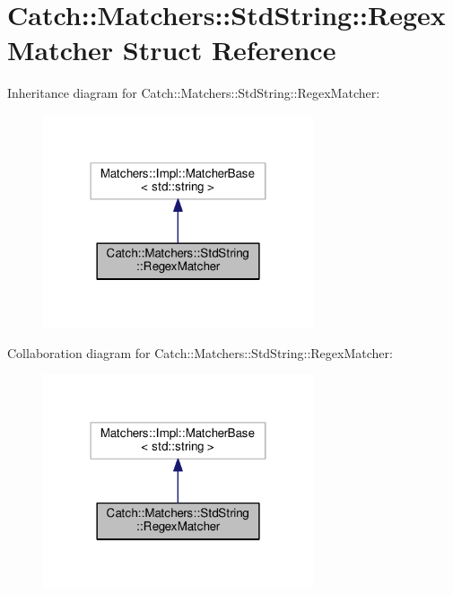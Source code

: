 \hypertarget{structCatch_1_1Matchers_1_1StdString_1_1RegexMatcher}{}\section{Catch\+:\+:Matchers\+:\+:Std\+String\+:\+:Regex\+Matcher Struct Reference}
\label{structCatch_1_1Matchers_1_1StdString_1_1RegexMatcher}


Inheritance diagram for Catch\+:\+:Matchers\+:\+:Std\+String\+:\+:Regex\+Matcher\+:
\nopagebreak
\begin{figure}[H]
\begin{center}
\leavevmode
\includegraphics[width=226pt]{structCatch_1_1Matchers_1_1StdString_1_1RegexMatcher__inherit__graph}
\end{center}
\end{figure}


Collaboration diagram for Catch\+:\+:Matchers\+:\+:Std\+String\+:\+:Regex\+Matcher\+:
\nopagebreak
\begin{figure}[H]
\begin{center}
\leavevmode
\includegraphics[width=226pt]{structCatch_1_1Matchers_1_1StdString_1_1RegexMatcher__coll__graph}
\end{center}
\end{figure}
